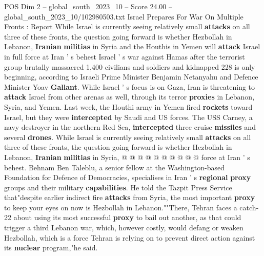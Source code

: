 \begin{textsample}{POS Dim 2 – global\_south\_2023\_10 – Score 24.00 – global\_south\_2023\_10/102980503.txt}  \label{ex:f2_pos_053}
Israel Prepares For War On Multiple Fronts : Report While Israel is currently seeing relatively small \textbf{attacks} on all three of these fronts, the question going forward is whether Hezbollah in Lebanon, \textbf{Iranian} \textbf{militias} in Syria and the Houthis in Yemen will \textbf{attack} Israel in full force at Iran ' s behest Israel ' s war against Hamas after the terrorist group brutally massacred 1,400 civilians and soldiers and kidnapped 228 is only beginning, according to Israeli Prime Minister Benjamin Netanyahu and Defence Minister Yoav \textbf{Gallant}.
While Israel ' s focus is on Gaza, Iran is threatening to \textbf{attack} Israel from other arenas as well, through its terror \textbf{proxies} in Lebanon, Syria, and Yemen.
Last week, the Houthi army in Yemen fired \textbf{rockets} toward Israel, but they were \textbf{intercepted} by Saudi and US forces.
The USS Carney, a navy destroyer in the northern Red Sea, \textbf{intercepted} three cruise \textbf{missiles} and several \textbf{drones}.
While Israel is currently seeing relatively small \textbf{attacks} on all three of these fronts, the question going forward is whether Hezbollah in Lebanon, \textbf{Iranian} \textbf{militias} in Syria, @ @ @ @ @ @ @ @ @ @ force at Iran ' s behest.
Behnam Ben Taleblu, a senior fellow at the Washington-based Foundation for Defence of Democracies, specialises in Iran ' s \textbf{regional} \textbf{proxy} groups and their military \textbf{capabilities}.
He told the Tazpit Press Service that"despite earlier indirect fire \textbf{attacks} from Syria, the most important \textbf{proxy} to keep your eyes on now is Hezbollah in Lebanon.""There, Tehran faces a catch-22 about using its most successful \textbf{proxy} to bail out another, as that could trigger a third Lebanon war, which, however costly, would defang or weaken Hezbollah, which is a force Tehran is relying on to prevent direct action against its \textbf{nuclear} program,"he said.

\end{textsample}
